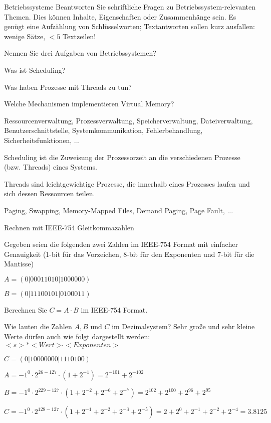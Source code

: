 \documentclass{exercisesheet}
\begin{document}
\begin{eexercises}[14]{Betriebssysteme}{
    Beantworten Sie schriftliche Fragen zu Betriebssystem-relevanten Themen. Dies können Inhalte, Eigenschaften oder Zusammenhänge sein. Es genügt eine Aufzählung von Schlüsselworten; Textantworten sollen kurz ausfallen: wenige Sätze, $<5$ Textzeilen!
  }
  \item Nennen Sie drei Aufgaben von Betriebssystemen?
  \item Was ist Scheduling?
  \item Was haben Prozesse mit Threads zu tun?
  \item Welche Mechanismen implementieren Virtual Memory?
\end{eexercises}

\begin{solutions}
  \item Ressourcenverwaltung, Prozessverwaltung, Speicherverwaltung, Dateiverwaltung, Benutzerschnittstelle, Systemkommunikation, Fehlerbehandlung, Sicherheitsfunktionen, ...
  \item Scheduling ist die Zuweisung der Prozessorzeit an die verschiedenen Prozesse (bzw. Threads) eines Systems.
  \item Threads sind leichtgewichtige Prozesse, die innerhalb eines Prozesses laufen und sich dessen Ressourcen teilen.
  \item Paging, Swapping, Memory-Mapped Files, Demand Paging, Page Fault, ...
\end{solutions}

\begin{eexercises}[4]{Rechnen mit IEEE-754 Gleitkommazahlen}{
    Gegeben seien die folgenden zwei Zahlen im IEEE-754 Format mit einfacher Genauigkeit (1-bit für das Vorzeichen, 8-bit für den Exponenten und 7-bit für die Mantisse)\par
    \centering $A = (0|00011010|1000000)$\par $B = (0|11100101|0100011)$
  }
  \item Berechnen Sie $C = A \cdot B$ im IEEE-754 Format.
  \item Wie lauten die Zahlen $A, B$ und $C$ im Dezimalsystem? Sehr große und sehr kleine Werte dürfen auch wie folgt dargestellt werden: $<s>*<Wert> \hat{} <Exponenten>$
\end{eexercises}

\begin{solutions}
  \item $C = (0|10000000|1110100)$
  \item
  $A = {-1}^0 \cdot 2^{26-127} \cdot (1+2^{-1}) = 2^{-101} + 2^{-102}$\par
  $B = {-1}^0 \cdot 2^{229-127} \cdot (1+2^{-2}+2^{-6}+2^{-7}) = 2^{102} + 2^{100} + 2^{96} + 2^{95}$\par
  $C = {-1}^0 \cdot 2^{128-127} \cdot (1+2^{-1}+2^{-2}+2^{-3}+2^{-5}) = 2 + 2^0 + 2^{-1} + 2^{-2} + 2^{-4} = 3.8125$
\end{solutions}
\end{document}
